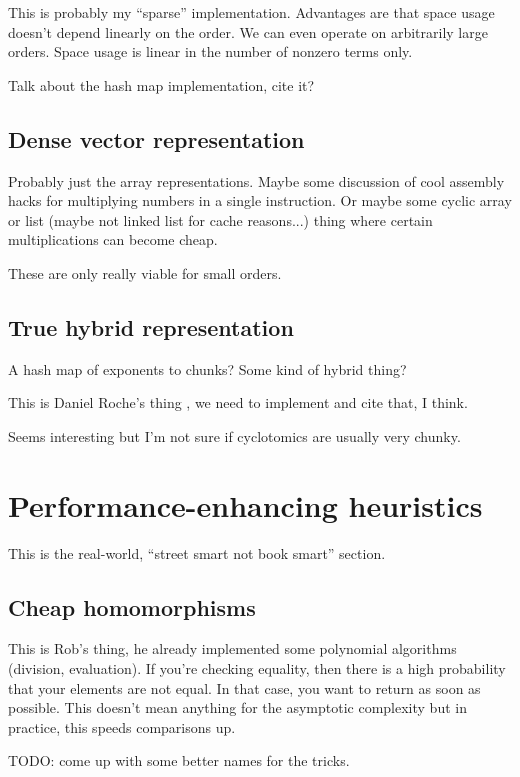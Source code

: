 \documentclass{article}
\begin{document}
This is probably my ``sparse'' implementation. Advantages are that
space usage doesn't depend linearly on the order. We can even operate
on arbitrarily large orders. Space usage is linear in the number of
nonzero terms only.

Talk about the hash map implementation, cite it?

\subsection{Dense vector representation}

Probably just the array representations. Maybe some discussion of cool
assembly hacks for multiplying numbers in a single instruction. Or
maybe some cyclic array or list (maybe not linked list for cache
reasons...) thing where certain multiplications can become cheap.

These are only really viable for small orders.

\subsection{True hybrid representation}

A hash map of exponents to chunks? Some kind of hybrid thing?

This is Daniel Roche's thing \cite{Roche2018}, we need to implement
and cite that, I think.

Seems interesting but I'm not sure if cyclotomics are usually very
chunky.

\section{Performance-enhancing heuristics}

This is the real-world, ``street smart not book smart'' section.

\subsection{Cheap homomorphisms}

This is Rob's thing, he already implemented some polynomial algorithms
(division, evaluation). If you're checking equality, then there is a
high probability that your elements are not equal. In that case, you
want to return as soon as possible. This doesn't mean anything for the
asymptotic complexity but in practice, this speeds comparisons up.

TODO: come up with some better names for the tricks.
\end{document}
